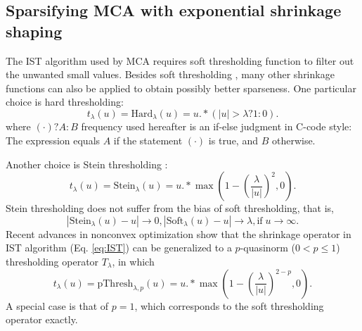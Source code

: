 \subsection{Sparsifying MCA with exponential shrinkage shaping}

The IST algorithm used by MCA requires soft thresholding function to filter out the unwanted small values. Besides soft thresholding \citep{donoho1995noising}, many other shrinkage functions can also be applied to obtain possibly better sparseness. One particular choice is hard thresholding:
\begin{equation}
t_{\lambda}(u)=\mathrm{Hard}_{\lambda}(u)=u.*(|u|>\lambda?1:0).
\end{equation}
where $(\cdot)?A:B$ frequency used hereafter is an if-else judgment in C-code style:  The expression equals $A$ if the statement $(\cdot)$ is true, and $B$ otherwise.

Another choice is Stein thresholding \citep{peyre2010advanced,mallat2009}:
\begin{equation}\label{eq:stein}
t_{\lambda}(u)=\mathrm{Stein}_{\lambda}(u)=u.*\max\left(1-(\frac{\lambda}{|u|})^{2},0\right).
\end{equation}
Stein thresholding does not suffer from the bias of soft thresholding, that is,
\begin{equation}
|\mathrm{Stein}_{\lambda}(u)-u| \rightarrow 0, |\mathrm{Soft}_{\lambda}(u)-u|\rightarrow \lambda,
\mathrm{if}\; u\rightarrow\infty.
\end{equation}
Recent advances in nonconvex optimization \citep{chartrand2012,chartrand2013generalized,chartrand2013nonconvex} show that the shrinkage operator in IST algorithm (Eq. \eqref{eq:IST}) can be generalized to a $p$-quasinorm ($0<p\leq1$) thresholding operator $T_{\lambda}$, in which
\begin{equation}\label{eq:pthresh}
t_{\lambda}(u)=\mathrm{pThresh}_{\lambda,p}(u)=u.*\max\left(1-(\frac{\lambda}{|u|})^{2-p},0\right).
\end{equation}
A special case is that of $p=1$, which corresponds to the soft thresholding operator exactly.




